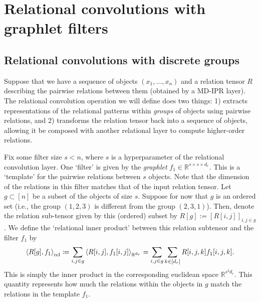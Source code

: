 \section{Relational convolutions with graphlet filters}\label{sec:relconv}

\subsection{Relational convolutions with discrete groups}
Suppose that we have a sequence of objects $(x_1, \ldots, x_n)$ and a relation tensor $R$ describing the pairwise relations between them (obtained by a MD-IPR layer). The relational convolution operation we will define does two things: 1) extracts representations of the relational patterns within \textit{groups} of objects using pairwise relations, and 2) transforms the relation tensor back into a sequence of objects, allowing it be composed with another relational layer to compute higher-order relations.

Fix some filter size $s < n$, where $s$ is a hyperparameter of the relational convolution layer. One `filter' is given by the \textit{graphlet} $f_1 \in \mathbb{R}^{s \times s \times d_r}$. This is a `template' for the pairwise relations between $s$ objects. Note that the dimension of the relations in this filter matches that of the input relation tensor. Let $g \subset [n]$ be a subset of the objects of size $s$. Suppose for now that $g$ is an ordered set (i.e., the group $(1, 2, 3)$ is different from the group $(2, 3, 1)$). Then, denote the relation sub-tensor given by this (ordered) subset by $R[g] := [R[i,j]]_{i,j \in g}$. We define the `relational inner product' between this relation subtensor and the filter $f_1$ by
\begin{equation}
    \label{eq:relational_inner_prod_one_filt}
    \left\langle R[g], f_1 \right\rangle_\mathrm{rel} \coloneqq \sum_{i,j \in g} \left \langle R[i,j], f_1[i,j] \right\rangle_{\mathbb{R}^{d_r}} = \sum_{i,j \in g} \sum_{k \in [d_r]} R[i,j,k] f_1[i,j,k].
\end{equation}
This is simply the inner product in the corresponding euclidean space $\mathbb{R}^{s^2 d_r}$. This quantity represents how much the relations within the objects in $g$ match the relations in the template $f_1$.


